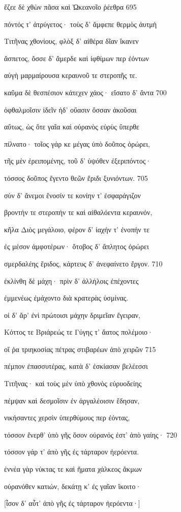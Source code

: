 ἔζεε δὲ χθὼν πᾶσα καὶ Ὠκεανοῖο ῥέεθρα \num{695}

πόντός τ' ἀτρύγετος· τοὺς δ' ἄμφεπε θερμὸς ἀυτμὴ 

Τιτῆνας χθονίους, φλὸξ δ' αἰθέρα δῖαν ἵκανεν

ἄσπετος, ὄσσε δ' ἄμερδε καὶ ἰφθίμων περ ἐόντων

αὐγὴ μαρμαίρουσα κεραυνοῦ τε στεροπῆς τε.

καῦμα δὲ θεσπέσιον κάτεχεν χάος· εἴσατο δ' ἄντα \num{700} 

ὀφθαλμοῖσιν ἰδεῖν ἠδ' οὔασιν ὄσσαν ἀκοῦσαι

αὔτως, ὡς ὅτε γαῖα καὶ οὐρανὸς εὐρὺς ὕπερθε 

πίλνατο· τοῖος γάρ κε μέγας ὑπὸ δοῦπος ὀρώρει, 

τῆς μὲν ἐρειπομένης, τοῦ δ' ὑψόθεν ἐξεριπόντος· 

τόσσος δοῦπος ἔγεντο θεῶν ἔριδι ξυνιόντων. \num{705}

σὺν δ' ἄνεμοι ἔνοσίν τε κονίην τ' ἐσφαράγιζον

βροντήν τε στεροπήν τε καὶ αἰθαλόεντα κεραυνόν,

κῆλα Διὸς μεγάλοιο, φέρον δ' ἰαχήν τ' ἐνοπήν τε

ἐς μέσον ἀμφοτέρων· ὄτοβος δ' ἄπλητος ὀρώρει 

σμερδαλέης ἔριδος, κάρτευς δ' ἀνεφαίνετο ἔργον. \num{710}

ἐκλίνθη δὲ μάχη· πρὶν δ' ἀλλήλοις ἐπέχοντες 

ἐμμενέως ἐμάχοντο διὰ κρατερὰς ὑσμίνας.

οἱ δ' ἄρ' ἐνὶ πρώτοισι μάχην δριμεῖαν ἔγειραν, 

Κόττος τε Βριάρεώς τε Γύγης τ' ἄατος πολέμοιο·

οἵ ῥα τριηκοσίας πέτρας στιβαρέων ἀπὸ χειρῶν \num{715} 

πέμπον ἐπασσυτέρας, κατὰ δ' ἐσκίασαν βελέεσσι

Τιτῆνας· καὶ τοὺς μὲν ὑπὸ χθονὸς εὐρυοδείης 

πέμψαν καὶ δεσμοῖσιν ἐν ἀργαλέοισιν ἔδησαν,

νικήσαντες χερσὶν ὑπερθύμους περ ἐόντας, 

τόσσον ἔνερθ' ὑπὸ γῆς ὅσον οὐρανός ἐστ' ἀπὸ γαίης· \num{720} 

τόσσον γάρ τ' ἀπὸ γῆς ἐς τάρταρον ἠερόεντα.

ἐννέα γὰρ νύκτας τε καὶ ἤματα χάλκεος ἄκμων

οὐρανόθεν κατιών, δεκάτῃ κ' ἐς γαῖαν ἵκοιτο· 

{[}ἶσον δ' αὖτ' ἀπὸ γῆς ἐς τάρταρον ἠερόεντα·{]}

